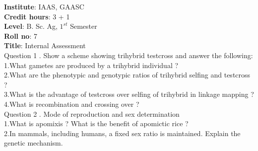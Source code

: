 \documentclass[12pt]{article}\usepackage[]{graphicx}\usepackage[]{color}
\begin{document}
{            \textbf{Institute}: IAAS, GAASC \\}\textbf{Credit hours}: 3 + 1 \\\textbf{Level}: B. Sc. Ag, $1^{st}$ Semester \\\textbf{Roll no}: 7 \\\textbf{Title}: Internal Assessment \\[1cm]Question 1 . Show a scheme showing trihybrid testcross and answer the following: \\\hspace{0.5cm}1.What gametes are produced by a trihybrid individual ?\\\hspace{0.5cm}2.What are the phenotypic and genotypic ratios of trihybrid selfing and testcross ?\\\hspace{0.5cm}3.What is the advantage of testcross over selfing of trihybrid in linkage mapping ?\\\hspace{0.5cm}4.What is recombination and crossing over ?\\Question 2 . Mode of reproduction and sex determination \\\hspace{0.5cm}1.What is apomixis ? What is the benefit of apomictic rice ?\\\hspace{0.5cm}2.In mammals, including humans, a fixed sex ratio is maintained. Explain the genetic mechanism.\\
\end{document}
